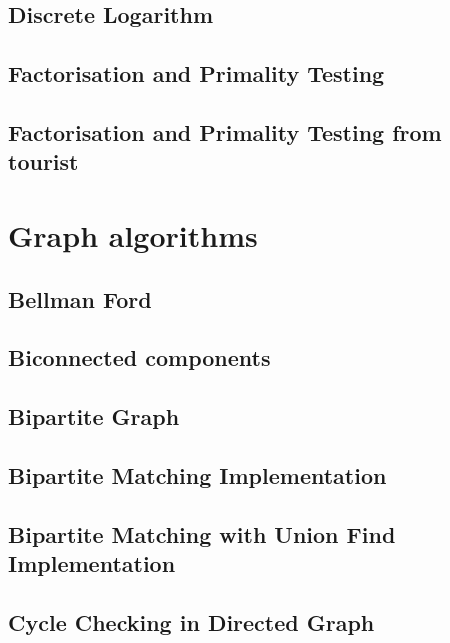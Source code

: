 \subsection{Discrete Logarithm}
\raggedbottom
\hrulefill
\subsection{Factorisation and Primality Testing}
\raggedbottom
\hrulefill
\subsection{Factorisation and Primality Testing from tourist}
\raggedbottom
\hrulefill

\section{Graph algorithms}
\subsection{Bellman Ford}
\raggedbottom
\hrulefill
\subsection{Biconnected components}
\raggedbottom
\hrulefill
\subsection{Bipartite Graph}
\raggedbottom
\hrulefill
\subsection{Bipartite Matching Implementation}
\raggedbottom
\hrulefill
\subsection{Bipartite Matching with Union Find Implementation}
\raggedbottom
\hrulefill
\subsection{Cycle Checking in Directed Graph}
\raggedbottom
\hrulefill
